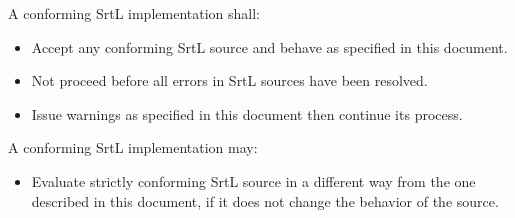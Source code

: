 A conforming SrtL implementation shall:
\begin{itemize}
    \item Accept any conforming SrtL source and behave as specified in this 
          document.
    \item Not proceed before all errors in SrtL sources have been resolved.
    \item Issue warnings as specified in this document then continue its 
          process.
\end{itemize}

A conforming SrtL implementation may:
\begin{itemize}
    \item Evaluate strictly conforming SrtL source in a different way from the 
          one described in this document, if it does not change the behavior
          of the source.
\end{itemize}